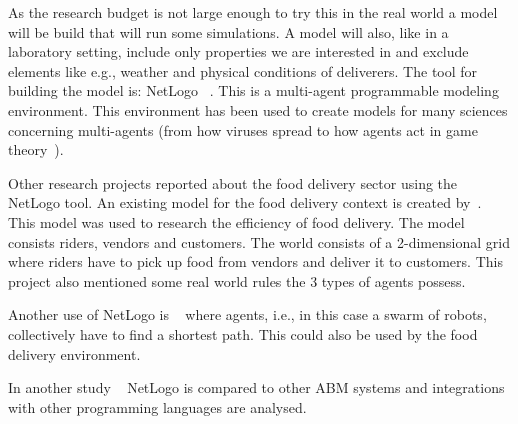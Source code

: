 As the research budget is not large enough to try this in the real world a model will be build that will run some simulations.
A model will also, like in a laboratory setting, include only properties we are interested in and exclude elements like e.g., weather and physical conditions of deliverers.
The tool for building the model is: NetLogo ~\cite{NetLogo2024}.
This is a multi-agent programmable modeling environment.
This environment has been used to create models for many sciences concerning multi-agents (from how viruses spread to how agents act in game theory~\cite{r2019agent}).

Other research projects reported about the food delivery sector using the NetLogo tool.
An existing model for the food delivery context is created by~\cite{ismail2024software}.
This model was used to research the efficiency of food delivery.
The model consists riders, vendors and customers.
The world consists of a 2-dimensional grid where riders have to pick up food from vendors and deliver it to customers.
This project also mentioned some real world rules the 3 types of agents possess.

Another use of NetLogo is ~\cite{chella2023quantum} where agents, i.e., in this case a swarm of robots, collectively have to find a shortest path.
This could also be used by the food delivery environment.

In another study ~\cite{antelmi2024reliable} NetLogo is compared to other ABM systems and integrations with other programming languages are analysed.
